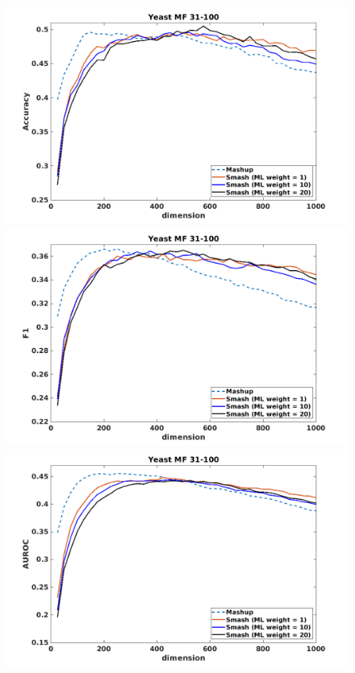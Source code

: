 \documentclass[12pt]{amsart}
\theoremstyle{remark}
\theoremstyle{definition}
\numberwithin{equation}{section} \numberwithin{table}{section}
\numberwithin{figure}{section}
\numberwithin{algorithm}{section}
\numberwithin{theorem}{section}
\begin{document}
\begin{figure}[h!]
	\centering
	\includegraphics[width=.8\linewidth]{Yeast-MF-31-100-Acc}  \\
	\includegraphics[width=.8\linewidth]{Yeast-MF-31-100-F1}  \\
	\includegraphics[width=.8\linewidth]{Yeast-MF-31-100-AUROC} 
\end{figure}
\end{document}
